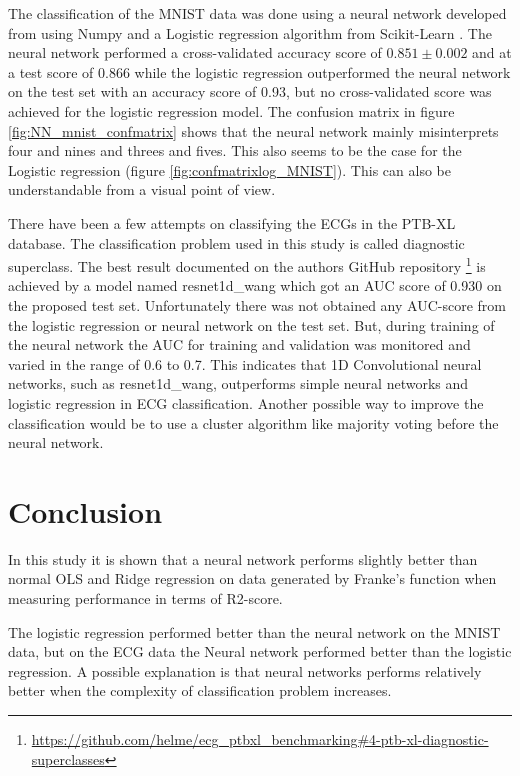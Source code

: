 \documentclass[twocolumn]{cinc}
\begin{document}
The classification of the MNIST data was done using a neural network developed from using Numpy \cite{van_der_walt_numpy_2011} and a Logistic regression algorithm from Scikit-Learn \cite{pedregosa_scikit-learn_2011}. The neural network performed a cross-validated accuracy score of $0.851\pm0.002$ and at a test score of 0.866 while the logistic regression outperformed the neural network on the test set with an accuracy score of 0.93, but no cross-validated score was achieved for the logistic regression model. The confusion matrix in figure \ref{fig:NN_mnist_confmatrix} shows that the neural network mainly misinterprets four and nines and threes and fives. This also seems to be the case for the Logistic regression (figure \ref{fig:confmatrixlog_MNIST}). This can also be understandable from a visual point of view.

There have been a few attempts on classifying the ECGs in the PTB-XL database. The classification problem used in this study is called diagnostic superclass. The best result documented on the authors GitHub repository \footnote{\url{https://github.com/helme/ecg_ptbxl_benchmarking#4-ptb-xl-diagnostic-superclasses}} is achieved by a model named resnet1d\_wang which got an AUC score of 0.930 on the proposed test set. Unfortunately there was not obtained any AUC-score from the logistic regression or neural network on the test set. But, during training of the neural network the AUC for training and validation was monitored and varied in the range of 0.6 to 0.7. This indicates that 1D Convolutional neural networks, such as resnet1d\_wang, outperforms simple neural networks and logistic regression in ECG classification. Another possible way to improve the classification would be to use a cluster algorithm like majority voting before the neural network.


\section{Conclusion}
In this study it is shown that a neural network performs slightly better than normal OLS and Ridge regression on data generated by Franke's function when measuring performance in terms of R2-score. 

The logistic regression performed better than the neural network on the MNIST data, but on the ECG data the Neural network performed better than the logistic regression. A possible explanation is that neural networks performs relatively better when the complexity of classification problem increases.
\end{document}
